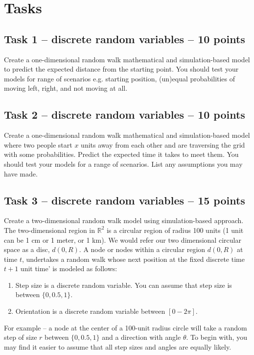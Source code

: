 \documentclass[a4paper, 11pt]{article}
\begin{document}
\section {Tasks}

\subsection {Task 1 -- discrete random variables -- 10 points}
Create a one-dimensional random walk mathematical and simulation-based model to predict the expected distance from the starting point. You should test your models for range of scenarios e.g. starting position, (un)equal probabilities of moving left, right, and not moving at all. 

\subsection {Task 2 -- discrete random variables -- 10 points}
Create a one-dimensional random walk mathematical and simulation-based model where two people start $x$ units away from each other and are traversing the grid with some probabilities. Predict the expected time it takes to meet them. You should test your models for a range of scenarios. List any assumptions you may have made.

\subsection {Task 3 -- discrete random variables -- 15 points}
Create a two-dimensional random walk model using simulation-based approach. The two-dimensional region in $\mathbb R^2$ is a circular region of radius 100 units (1 unit can be 1 cm or 1 meter, or 1 km).  We would refer our two dimensional circular space as a disc, $d(0, R)$.  A node or nodes within a circular region $d(0, R)$ at time $t$, undertakes a random walk whose next position at the fixed discrete time $t+1$ unit time’ is modeled as follows:
\begin{enumerate}[label=(\alph*)]
    \item Step size is a discrete random variable. You can assume that step size is between $\{0, 0.5, 1\}$.
    \item Orientation is a discrete random variable between $[0 - 2\pi]$.
\end{enumerate}
For example -- a node at the center of a 100-unit radius circle will take a random step of size $r$ between $\{0, 0.5, 1\}$ and a direction with angle $\theta$. To begin with, you may find it easier to assume that all step sizes and angles are equally likely. 
\end{document}
